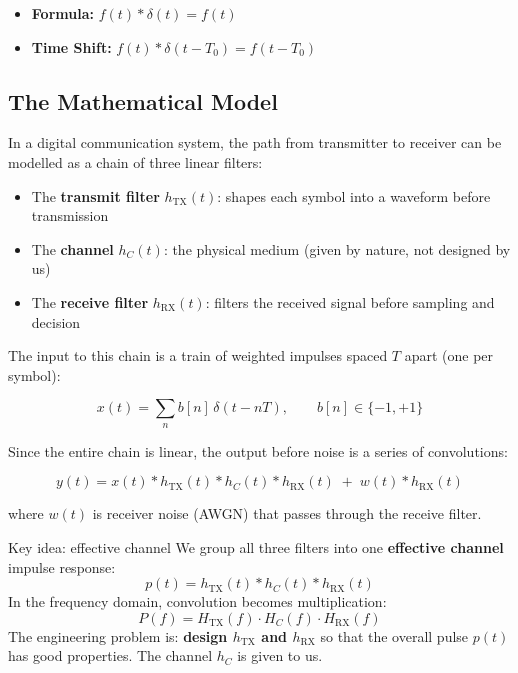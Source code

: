 \begin{itemize}
\item \textbf{Formula:} $f(t) * \delta(t) = f(t)$
\item \textbf{Time Shift:} $f(t) * \delta(t - T_0) = f(t - T_0)$
\end{itemize}

\subsection{The Mathematical Model }

In a digital communication system, the path from transmitter to receiver can be modelled as a chain of three linear filters:

\begin{itemize}
\item The \textbf{transmit filter} $h_{\text{TX}}(t)$: shapes each symbol into a waveform before transmission
\item The \textbf{channel} $h_C(t)$: the physical medium (given by nature, not designed by us)
\item The \textbf{receive filter} $h_{\text{RX}}(t)$: filters the received signal before sampling and decision
\end{itemize}

The input to this chain is a train of weighted impulses spaced $T$ apart (one per symbol):

\begin{equation}
x(t) = \sum_n b[n]\,\delta(t - nT), \qquad b[n] \in \{-1, +1\}
\end{equation}

Since the entire chain is linear, the output before noise is a series of convolutions:

\begin{equation}
y(t) = x(t) * h_{\text{TX}}(t) * h_C(t) * h_{\text{RX}}(t) \;+\; w(t) * h_{\text{RX}}(t)
\end{equation}

where $w(t)$ is receiver noise (AWGN) that passes through the receive filter.

\begin{KeyBox}{Key idea: effective channel}
We group all three filters into one \textbf{effective channel} impulse response:
\begin{equation}
p(t) = h_{\text{TX}}(t) * h_C(t) * h_{\text{RX}}(t)
\end{equation}
In the frequency domain, convolution becomes multiplication:
\begin{equation}
P(f) = H_{\text{TX}}(f) \cdot H_C(f) \cdot H_{\text{RX}}(f)
\end{equation}
The engineering problem is: \textbf{design $h_{\text{TX}}$ and $h_{\text{RX}}$} so that the overall pulse $p(t)$ has good properties. The channel $h_C$ is given to us.
\end{KeyBox}

